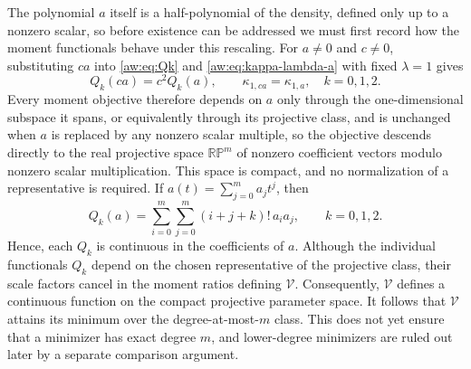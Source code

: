 \documentclass[11pt]{article}
\numberwithin{equation}{section}
\theoremstyle{definition}
\theoremstyle{remark}
\newcommand{\Vcal}{\mathcal V}
\begin{document}
The polynomial $a$ itself
is a half-polynomial of the density, defined only up to a nonzero scalar,
so before existence can be addressed we must first record how the moment
functionals behave under this rescaling.
For $a\ne0$ and $c\ne0$, substituting $ca$ into
\eqref{aw:eq:Qk} and \eqref{aw:eq:kappa-lambda-a} with fixed $\lambda=1$ gives
\begin{equation*}
 Q_k(ca)=c^2Q_k(a), \qquad \kappa_{1,ca}=\kappa_{1,a},
 \quad k=0,1,2.
\end{equation*}
Every moment objective therefore depends on $a$ only through the
one-dimensional subspace it spans, or equivalently through its projective
class, and is unchanged when $a$ is replaced by any nonzero scalar multiple,
so the objective 
descends directly to the real
projective space $\mathbb{RP}^m$ of nonzero coefficient vectors modulo
nonzero scalar multiplication. This space is compact, and no normalization
of a representative is required.
If $a(t)=\sum_{j=0}^m a_jt^j$, then
\begin{equation*}
Q_k(a)=\sum_{i=0}^m\sum_{j=0}^m(i+j+k)!{\,}a_i a_j,
\qquad k=0,1,2.
\end{equation*}
Hence, each $Q_k$ is continuous in the coefficients of $a$. Although the
individual functionals $Q_k$ depend on the chosen representative of the
projective class, their scale factors cancel in the moment ratios defining
$\Vcal$. Consequently, $\Vcal$ defines a continuous function on the
compact projective parameter space.
It follows that $\Vcal$ attains its minimum over the degree-at-most-$m$ class. This does not yet ensure that a minimizer has exact degree $m$, and lower-degree minimizers are ruled out later by a separate comparison argument.
\end{document}
